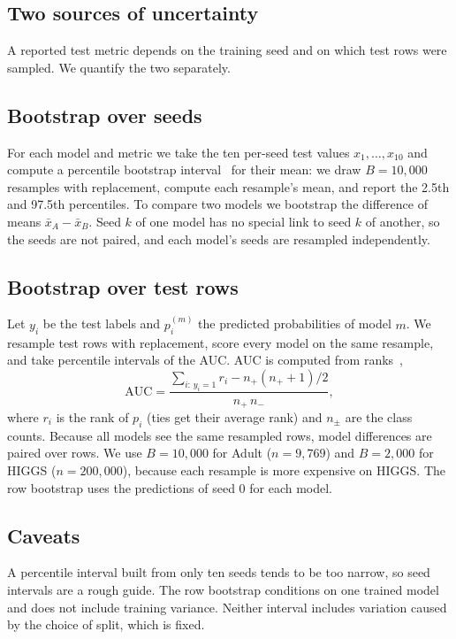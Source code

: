 \documentclass[conference]{IEEEtran}
\begin{document}
\subsection{Two sources of uncertainty}
A reported test metric depends on the training seed and on which test rows were sampled. We quantify the two separately.

\subsection{Bootstrap over seeds}
For each model and metric we take the ten per-seed test values $x_1,\dots,x_{10}$ and compute a percentile bootstrap interval~\cite{efron1993} for their mean: we draw $B=10{,}000$ resamples with replacement, compute each resample's mean, and report the 2.5th and 97.5th percentiles. To compare two models we bootstrap the difference of means $\bar{x}_A-\bar{x}_B$. Seed $k$ of one model has no special link to seed $k$ of another, so the seeds are not paired, and each model's seeds are resampled independently.

\subsection{Bootstrap over test rows}
Let $y_i$ be the test labels and $p_i^{(m)}$ the predicted probabilities of model $m$. We resample test rows with replacement, score every model on the same resample, and take percentile intervals of the AUC. AUC is computed from ranks~\cite{hanley1982},
\begin{equation}
\mathrm{AUC}=\frac{\sum_{i:\,y_i=1} r_i - n_+(n_++1)/2}{n_+\,n_-},
\end{equation}
where $r_i$ is the rank of $p_i$ (ties get their average rank) and $n_\pm$ are the class counts. Because all models see the same resampled rows, model differences are paired over rows. We use $B=10{,}000$ for Adult ($n=9{,}769$) and $B=2{,}000$ for HIGGS ($n=200{,}000$), because each resample is more expensive on HIGGS. The row bootstrap uses the predictions of seed 0 for each model.

\subsection{Caveats}
A percentile interval built from only ten seeds tends to be too narrow, so seed intervals are a rough guide. The row bootstrap conditions on one trained model and does not include training variance. Neither interval includes variation caused by the choice of split, which is fixed.
\end{document}
